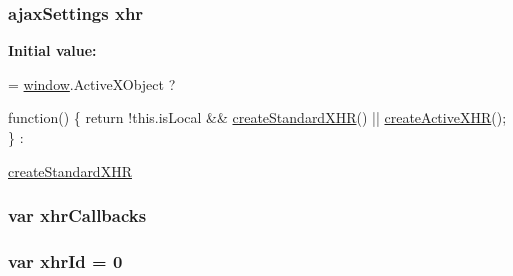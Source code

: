 \subsubsection[{xhr}]{ {\bf ajax\+Settings} xhr}\label{packages_2j_query_81_810_82_2_content_2_scripts_2jquery-1_810_82_8js_a0b7a5cb538ca9913b1b3b1c807ad06f0}
{\bfseries Initial value\+:}
\begin{DoxyCode}
= \hyperlink{_bibabook_2_scripts_2jquery-1_810_82_8js_a04a8a2bbfa9c15500892b8e5033d625b}{window}.ActiveXObject ?
    
    \textcolor{keyword}{function}() \{
        \textcolor{keywordflow}{return} !this.isLocal && \hyperlink{_bibabook_2_scripts_2jquery-1_810_82_8js_acea019a8b67e4d114deb75d1e0b3474a}{createStandardXHR}() || 
      \hyperlink{_bibabook_2_scripts_2jquery-1_810_82_8js_a54bf63f1b5f905292db45a1d6a9dc300}{createActiveXHR}();
    \} :
    
    \hyperlink{_bibabook_2_scripts_2jquery-1_810_82_8js_acea019a8b67e4d114deb75d1e0b3474a}{createStandardXHR}
\end{DoxyCode}
\hypertarget{packages_2j_query_81_810_82_2_content_2_scripts_2jquery-1_810_82_8js_a068f27a70831ff3a9e0ffa79e063847f}{}
\subsubsection[{xhr\+Callbacks}]{\setlength{\rightskip}{0pt plus 5cm}var xhr\+Callbacks}\label{packages_2j_query_81_810_82_2_content_2_scripts_2jquery-1_810_82_8js_a068f27a70831ff3a9e0ffa79e063847f}
\hypertarget{packages_2j_query_81_810_82_2_content_2_scripts_2jquery-1_810_82_8js_aa23ed64cf7afc9b028419517bf23fcea}{}
\subsubsection[{xhr\+Id}]{\setlength{\rightskip}{0pt plus 5cm}var xhr\+Id = 0}\label{packages_2j_query_81_810_82_2_content_2_scripts_2jquery-1_810_82_8js_aa23ed64cf7afc9b028419517bf23fcea}
\hypertarget{packages_2j_query_81_810_82_2_content_2_scripts_2jquery-1_810_82_8js_a271c099ab18ab35c15cac2faa2a097aa}{}
